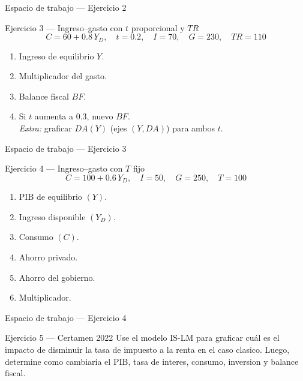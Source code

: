 \documentclass[aspectratio=169,10pt]{beamer}
\newcommand{\espacio}{\vfill\vfill}
\newcommand{\Yd}{Y_{\!D}}
\begin{document}
\begin{frame}{Espacio de trabajo — Ejercicio 2}
\espacio
\end{frame}

\begin{frame}{Ejercicio 3 — Ingreso–gasto con $t$ proporcional y $TR$}
\small
\[
C = 60 + 0.8\,\Yd,\quad t = 0.2,\quad I = 70,\quad G = 230,\quad TR = 110
\]
\begin{enumerate}\itemsep4pt
  \item Ingreso de equilibrio $Y$.
  \item Multiplicador del gasto.
  \item Balance fiscal $BF$.
  \item Si $t$ aumenta a $0.3$, nuevo $BF$. \\
  \textit{Extra:} graficar $DA(Y)$ (ejes $(Y,DA)$) para ambos $t$.
\end{enumerate}
\end{frame}

\begin{frame}{Espacio de trabajo — Ejercicio 3}
\espacio
\end{frame}

\begin{frame}{Ejercicio 4 — Ingreso–gasto con $T$ fijo}
\small
\[
C = 100 + 0.6\,\Yd,\quad I = 50,\quad G = 250,\quad T = 100
\]
\begin{enumerate}\itemsep4pt
  \item PIB de equilibrio $(Y)$.
  \item Ingreso disponible $(\Yd)$.
  \item Consumo $(C)$.
  \item Ahorro privado.
  \item Ahorro del gobierno.
  \item Multiplicador.
\end{enumerate}
\end{frame}

\begin{frame}{Espacio de trabajo — Ejercicio 4}
\espacio
\end{frame}

\begin{frame}{Ejercicio 5 — Certamen 2022}
Use el modelo IS-LM para graficar cuál es el impacto de disminuir la tasa de impuesto a la renta en el caso clasico. Luego, determine como cambiaría el PIB, tasa de interes, consumo, inversion y balance fiscal.
\end{frame}
\end{document}
